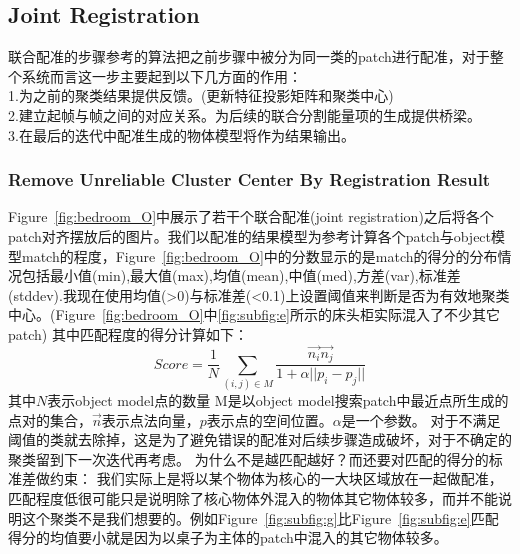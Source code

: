 \subsection{Joint Registration}
\label{subsec:registration}
联合配准的步骤参考\cite{Evangelidis-ECCV-2014}的算法把之前步骤中被分为同一类的patch进行配准，对于整个系统而言这一步主要起到以下几方面的作用：\\
1.为之前的聚类结果提供反馈。(更新特征投影矩阵和聚类中心)\\
2.建立起帧与帧之间的对应关系。为后续的联合分割能量项的生成提供桥梁。\\
3.在最后的迭代中配准生成的物体模型将作为结果输出。\\
\subsubsection{Remove Unreliable Cluster Center By Registration Result}
Figure~\ref{fig:bedroom_O}中展示了若干个联合配准(joint registration)之后将各个patch对齐摆放后的图片。我们以配准的结果模型为参考计算各个patch与object模型match的程度，Figure~\ref{fig:bedroom_O}中的分数显示的是match的得分的分布情况包括最小值(min),最大值(max),均值(mean),中值(med),方差(var),标准差(stddev).我现在使用均值(>0)与标准差(<0.1)上设置阈值来判断是否为有效地聚类中心。(Figure~\ref{fig:bedroom_O}中\ref{fig:subfig:e}所示的床头柜实际混入了不少其它patch)
其中匹配程度的得分计算如下：
$$Score=\frac{1}{N}\sum_{(i,j)\in M }\frac{\vec{n_i}\vec{n_j}}{1+\alpha||p_i-p_j||} $$
其中$N$表示object model点的数量 M是以object model搜索patch中最近点所生成的点对的集合，$\vec{n}$表示点法向量，$p$表示点的空间位置。$\alpha$是一个参数。
对于不满足阈值的类就去除掉，这是为了避免错误的配准对后续步骤造成破坏，对于不确定的聚类留到下一次迭代再考虑。
为什么不是越匹配越好？而还要对匹配的得分的标准差做约束：
我们实际上是将以某个物体为核心的一大块区域放在一起做配准，匹配程度低很可能只是说明除了核心物体外混入的物体其它物体较多，而并不能说明这个聚类不是我们想要的。例如Figure~\ref{fig:subfig:g}比Figure~\ref{fig:subfig:e}匹配得分的均值要小就是因为以桌子为主体的patch中混入的其它物体较多。
